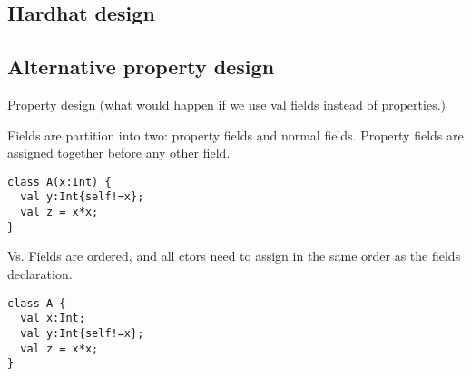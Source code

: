 \subsection{Hardhat design}

\subsection{Alternative property design}

Property design (what would happen if we use val fields instead of properties.)

Fields are partition into two: property fields and normal fields. Property fields are assigned together before any other field.
\begin{lstlisting}
class A(x:Int) {
  val y:Int{self!=x};
  val z = x*x;
}
\end{lstlisting}
Vs.
Fields are ordered, and all ctors need to assign in the same order as the fields declaration.
\begin{lstlisting}
class A {
  val x:Int;
  val y:Int{self!=x};
  val z = x*x;
}
\end{lstlisting}
